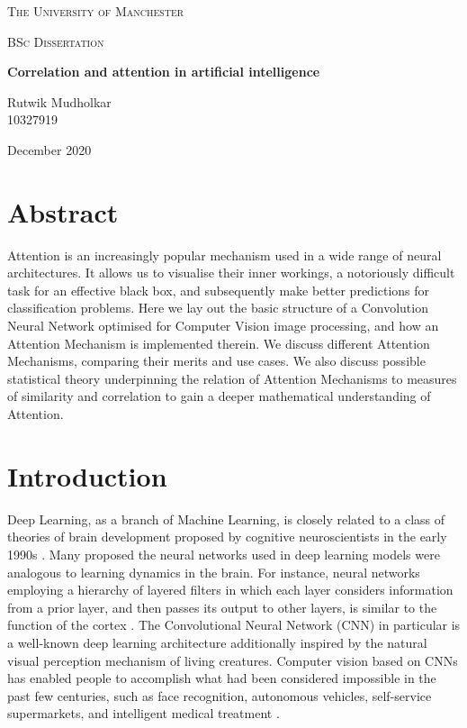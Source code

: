 \documentclass[11pt]{article}
\begin{document}
\onehalfspacing
{
	\centering
	{\scshape\LARGE The University of Manchester \par}
	\vspace{1cm}
	{\scshape\Large BSc Dissertation\par}
	\vspace{1.5cm}
	{\huge\bfseries Correlation and attention in artificial intelligence\par}
	\vspace{2cm}
	{\Large Rutwik Mudholkar\\10327919 \par}
	\vspace{1cm}
	{\Large December 2020 \par}
	
	
}

\vspace{\fill}
\section*{Abstract}
Attention is an increasingly popular mechanism used in a wide range of neural architectures. It allows us to visualise their inner workings, a notoriously difficult task for an effective black box, and subsequently make better predictions for classification problems. Here we lay out the basic structure of a Convolution Neural Network optimised for Computer Vision image processing, and how an Attention Mechanism is implemented therein. We discuss different Attention Mechanisms, comparing their merits and use cases. We also discuss possible statistical theory underpinning the relation of Attention Mechanisms to measures of similarity and correlation to gain a deeper mathematical understanding of Attention.
\vspace{\fill}

\newpage
{\Large{\tableofcontents}}

\newpage
\setlength\parindent{0pt}
\section{Introduction}

Deep Learning, as a branch of Machine Learning, is closely related to a class of theories of brain development proposed by cognitive neuroscientists in the early 1990s \cite{utgoff}. Many proposed the neural networks used in deep learning models were analogous to learning dynamics in the brain. For instance, neural networks employing a hierarchy of layered filters in which each layer considers information from a prior layer, and then passes its output to other layers, is similar to the function of the cortex \cite{shrager}. The Convolutional Neural Network (CNN) in particular is a well-known deep learning architecture additionally inspired by the natural visual perception mechanism of living creatures. Computer vision based on CNNs has enabled people to accomplish what had been considered impossible in the past few centuries, such as face recognition, autonomous vehicles, self-service supermarkets, and intelligent medical treatment \cite{cnnintro}. \newline
\end{document}
